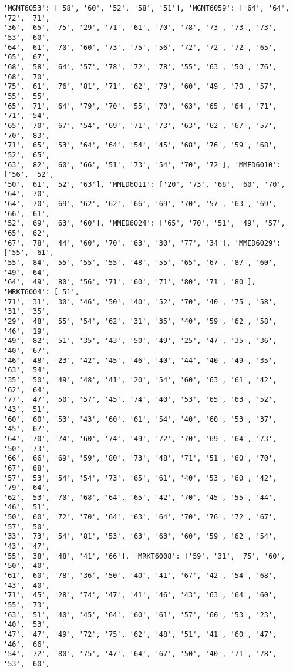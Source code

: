 \documentclass[11pt]{article}
\begin{document}
\begin{Verbatim}[commandchars=\\\{\}]
'MGMT6053': ['58', '60', '52', '58', '51'], 'MGMT6059': ['64', '64', '72', '71',
'36', '65', '75', '29', '71', '61', '70', '78', '73', '73', '73', '53', '60',
'64', '61', '70', '60', '73', '75', '56', '72', '72', '72', '65', '65', '67',
'68', '58', '64', '57', '78', '72', '78', '55', '63', '50', '76', '68', '70',
'75', '61', '76', '81', '71', '62', '79', '60', '49', '70', '57', '55', '55',
'65', '71', '64', '79', '70', '55', '70', '63', '65', '64', '71', '71', '54',
'65', '70', '67', '54', '69', '71', '73', '63', '62', '67', '57', '70', '83',
'71', '65', '53', '64', '64', '54', '45', '68', '76', '59', '68', '52', '65',
'63', '82', '60', '66', '51', '73', '54', '70', '72'], 'MMED6010': ['56', '52',
'50', '61', '52', '63'], 'MMED6011': ['20', '73', '68', '60', '70', '64', '70',
'64', '70', '69', '62', '62', '66', '69', '70', '57', '63', '69', '66', '61',
'52', '69', '63', '60'], 'MMED6024': ['65', '70', '51', '49', '57', '65', '62',
'67', '78', '44', '60', '70', '63', '30', '77', '34'], 'MMED6029': ['55', '61',
'55', '84', '55', '55', '55', '48', '55', '65', '67', '87', '60', '49', '64',
'64', '49', '80', '56', '71', '60', '71', '80', '71', '80'], 'MRKT6004': ['51',
'71', '31', '30', '46', '50', '40', '52', '70', '40', '75', '58', '31', '35',
'29', '48', '55', '54', '62', '31', '35', '40', '59', '62', '58', '46', '19',
'49', '82', '51', '35', '43', '50', '49', '25', '47', '35', '36', '40', '67',
'46', '48', '23', '42', '45', '46', '40', '44', '40', '49', '35', '63', '54',
'35', '50', '49', '48', '41', '20', '54', '60', '63', '61', '42', '62', '64',
'77', '47', '50', '57', '45', '74', '40', '53', '65', '63', '52', '43', '51',
'60', '60', '53', '43', '60', '61', '54', '40', '60', '53', '37', '45', '67',
'64', '70', '74', '60', '74', '49', '72', '70', '69', '64', '73', '50', '73',
'66', '66', '69', '59', '80', '73', '48', '71', '51', '60', '70', '67', '68',
'57', '53', '54', '54', '73', '65', '61', '40', '53', '60', '42', '79', '64',
'62', '53', '70', '68', '64', '65', '42', '70', '45', '55', '44', '46', '51',
'50', '60', '72', '70', '64', '63', '64', '70', '76', '72', '67', '57', '50',
'33', '73', '54', '81', '53', '63', '63', '60', '59', '62', '54', '43', '47',
'55', '38', '48', '41', '66'], 'MRKT6008': ['59', '31', '75', '60', '50', '40',
'61', '60', '78', '36', '50', '40', '41', '67', '42', '54', '68', '43', '40',
'71', '45', '28', '74', '47', '41', '46', '43', '63', '64', '60', '55', '73',
'63', '51', '40', '45', '64', '60', '61', '57', '60', '53', '23', '40', '53',
'47', '47', '49', '72', '75', '62', '48', '51', '41', '60', '47', '46', '66',
'54', '72', '80', '75', '47', '64', '67', '50', '40', '71', '78', '53', '60',

\end{Verbatim}
\end{document}
